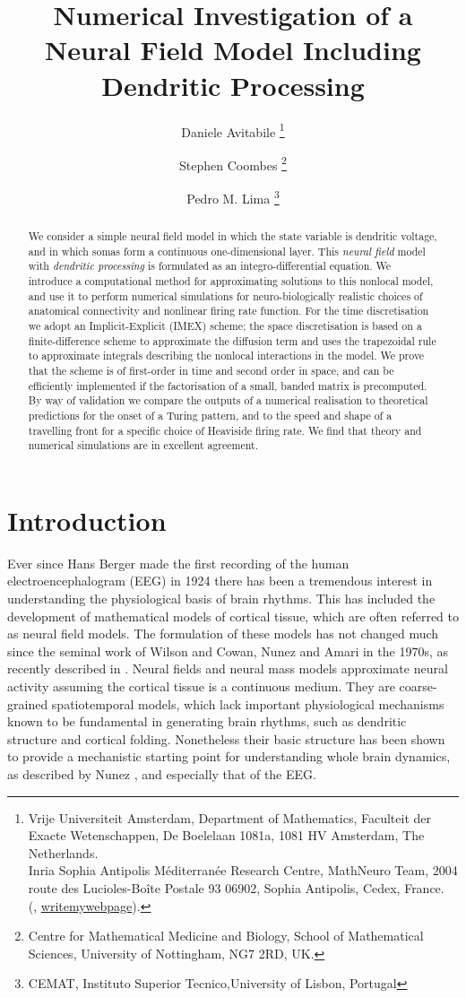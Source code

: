 \documentclass[a4paper,final]{siamart190516}
\title{Numerical Investigation of a Neural Field Model Including Dendritic Processing}
\author{%
  Daniele Avitabile%
  \thanks{%
    Vrije Universiteit Amsterdam,
    Department of Mathematics,
    Faculteit der Exacte Wetenschappen,
    De Boelelaan 1081a,
    1081 HV Amsterdam, The Netherlands.
  \protect\\
    Inria Sophia Antipolis M\'editerran\'ee Research Centre,
    MathNeuro Team,
    2004 route des Lucioles-Boîte Postale 93 06902,
    Sophia Antipolis, Cedex, France.
  \protect\\
    (\email{d.avitabile@vu.nl}, \url{writemywebpage}).
  }
  \and
  Stephen Coombes \thanks{Centre for Mathematical Medicine and Biology, School of
  Mathematical Sciences, University of Nottingham, NG7 2RD, UK.}
  \and
  Pedro M. Lima \thanks{CEMAT, Instituto Superior Tecnico,University of Lisbon,
  Portugal}
}
\begin{document}
\maketitle

\begin{abstract}
We consider a simple neural field model in which the state variable is dendritic
voltage, and in which somas form a continuous one-dimensional layer.
This \textit{neural field} model with \textit{dendritic processing} is formulated as
an integro-differential equation. We introduce a
computational method for approximating solutions to this nonlocal model, and use
it to perform numerical simulations for neuro-biologically realistic choices of
anatomical connectivity and nonlinear firing rate function.  For the time
discretisation we adopt an Implicit-Explicit (IMEX) scheme; the space discretisation
is based on a finite-difference scheme to approximate the diffusion term and uses the
trapezoidal rule to approximate integrals describing the nonlocal interactions in
the model. We prove that the scheme is of first-order in time and second order in
space, and can be efficiently implemented if the factorisation of a small, banded
matrix is precomputed. By way of validation we compare the outputs of a numerical
realisation to theoretical predictions for the onset of a Turing pattern, and to the
speed and shape of a travelling front for a specific choice of Heaviside firing rate.
We find that theory and numerical simulations are in excellent agreement.

\end{abstract}

\section{Introduction}

Ever since Hans Berger made the first recording of the human electroencephalogram
(EEG) in 1924 there has been a tremendous interest in understanding the physiological
basis of brain rhythms. This has included the development of mathematical models of
cortical tissue, which are often referred to as neural field models.  
The formulation of these models has not changed much since the seminal work of Wilson
and Cowan, Nunez and Amari in the 1970s, as recently described in \cite{Coombes2014}.
Neural fields and neural mass models approximate neural activity assuming the
cortical tissue is a continuous medium. They are coarse-grained spatiotemporal models,
which lack important physiological mechanisms known to be fundamental in generating brain
rhythms, such as dendritic structure and cortical folding. Nonetheless their basic
structure has been shown to provide a mechanistic starting point for understanding
whole brain dynamics, as described by Nunez \cite{Nunez1995}, and especially that of
the EEG.
\end{document}
